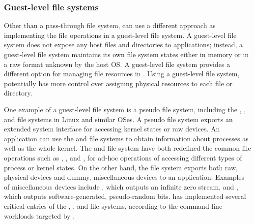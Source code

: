 \subsubsection{Guest-level file systems}


Other than a pass-through file system,
\thelibos{} can use a different approach as 
implementing the file operations
in a guest-level file system. %
A guest-level file system does not expose any host files and directories
to applications;
instead, a guest-level file system maintains its own file system states either in memory or in a raw format unknown by the host OS.
A guest-level file system
provides a different option for managing file resources in \thelibos{}. 
Using a guest-level file system,
\thelibos{} potentially has more control over assigning physical resources to each file or directory.


One example of a guest-level file system is a pseudo file system,
including the , , and  file systems in Linux and similar OSes.
A pseudo file system %
exports an extended system interface for accessing kernel states or raw devices.
An application can use the  and  file systems %
to obtain information about processes
as well as the whole kernel. 
The  and  file system have both redefined the common file operations such as , , and , for ad-hoc operations of accessing different types of process or kernel states.
On the other hand, the  file system %
exports both raw, physical devices and dummy, miscellaneous devices to an application.
Examples of miscellaneous devices include , which outputs an infinite zero stream, and , which outputs software-generated, pseudo-random bits.
\thelibos{} has implemented several critical entries of the , , and  file systems,
according to the command-line workloads targeted by \graphene{}. 



